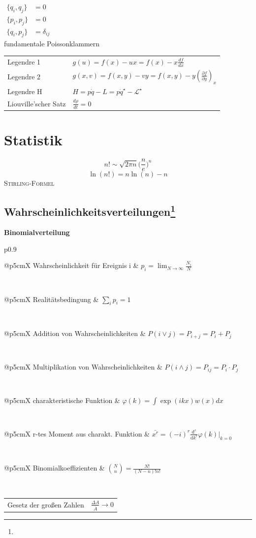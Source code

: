 \documentclass[12pt,a4paper, twoside]{article}
\makeatletter
\renewcommand{\d}[2]{\frac{d #1}{d #2}}
\newcommand{\pd}[2]{\frac{\partial #1}{\partial #2}}
\renewcommand{\=}[1]{\stackrel{#1}{=}}
\theoremstyle{definition}
\theoremstyle{remark}
\newcommand{\concept}[2]{%
\noindent
\begin{framed}
\noindent\textbf{#1}
\par\begin{tabular}{p{0.9\linewidth}}
#2
\end{tabular}
\end{framed}
}
\newcommand{\f}[2]{%
\noindent\begin{tabularx}{\linewidth}{@{}p{5cm}X}
#1 & $#2$
\end{tabularx}}
\makeatother
\begin{document}
\begin{center}
\begin{framed}

$\begin{aligned}
\{q_i, q_j\} &= 0 \quad\\
\{p_i, p_j\} &= 0\\
\{q_i, p_j\} &= \delta_{ij}
\end{aligned}$\\
fundamentale Poissonklammern

\end{framed}
\end{center}

\begin{center}
\begin{framed}
\noindent\begin{tabular}{ll}
Legendre 1 & $g(u) = f(x) -ux = f(x) - x \d{f}{x}$\\
Legendre 2 & $g(x,v) = f(x,y) - vy = f(x,y) - y (\pd{f}{y})_x$\\
Legendre H & $H = p\dot{q} - L = p \dot{q}^\star-\mathscr{L}^\star$\\
Liouville'scher Satz & $\d{\rho}{t} = 0$\\
\end{tabular}
\end{framed}
\end{center}

\newpage
\section{Statistik}

\begin{framed}
$$n! \sim \sqrt{2\pi n} \big(\frac{n}{e}\big)^n$$
$$\ln(n!) = n \ln(n) - n$$
\centering\textsc{Stirling-Formel}
\end{framed}


\subsection[Wahrscheinlichkeitsverteilungen]{Wahrscheinlichkeitsverteilungen\let\thefootnote\relax\footnote{}}

\concept{Binomialverteilung}{

\f{Wahrscheinlichkeit für Ereignis i}{p_i = \lim_{N \rightarrow \infty} \frac{N_i}{N}}\\
\f{Realitätsbedingung}{\sum_i p_i = 1}\\
\f{Addition von Wahrscheinlichkeiten}{P(i \lor j) = P_{i+j} = P_i + P_j}\\
\f{Multiplikation von Wahrscheinlichkeiten}{P(i \land j) = P_{ij} = P_i \cdot P_j}\\
\f{charakteristische Funktion}{\varphi (k) = \int \exp(ikx) w(x) dx}\\
\f{r-tes Moment aus charakt. Funktion}{\bar{x^r} = (-i)^r \frac{\text{d}^r}{\text{d}k^r} \varphi(k)|_{k=0}}\\
\f{Binomialkoeffizienten}{{N \choose n} = \frac{N!}{(N-n)! n!}}\\
\f{Gesetz der großen Zahlen}{\frac{\Delta A}{\bar A} \longrightarrow 0}
}
\end{document}
